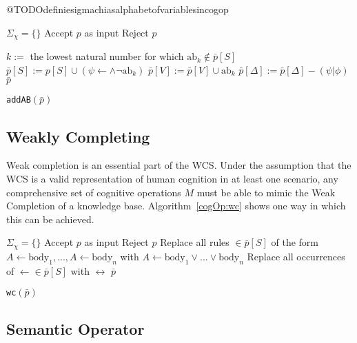 @TODOdefiniesigmachiasalphabetofvariablesincogop

\begin{algorithm}[H] \label{cogOp:addAB}
\SetAlgoLined
{}
{
$\Sigma_{\chi}=\{\}$\;
{
Accept $p$ as input\;
}
{
Reject $p$\;
}
}
{
{
$k:=$ the lowest natural number for which $\text{ab}_k \notin \bar{p}[S]$\;
$\bar{p}[S]:= p[S] \cup (\psi \leftarrow \land \lnot \text{ab}_k)$\;
$\bar{p}[V]:= \bar{p}[V] \cup \text{ab}_k$\;
$\bar{p}[\Delta]:=\bar{p}[\Delta] - (\psi|\phi)$\;
\Return $\bar{p}$
}

}

\caption{\texttt{addAB}$(\bar{p})$}
\end{algorithm}

\subsection{Weakly Completing}


Weak completion is an essential part of the WCS. Under the assumption that the WCS is a valid representation of human cognition in at least one scenario, any comprehensive set of cognitive operations $M$ must be able to mimic the Weak Completion of a knowledge base. Algorithm~\ref{cogOp:wc} shows one way in which this can be achieved.

\begin{algorithm}[H] \label{cogOp:wc}
\SetAlgoLined
{}
{
$\Sigma_{\chi}=\{\}$\;
{
Accept $p$ as input\;
}
{
Reject $p$\;
}
}
{
Replace all rules $\in \bar{p}[S]$ of the form $A\leftarrow \text{body}_1,...,A\leftarrow \text{body}_n$ with $A\leftarrow \text{body}_1 \lor ... \lor \text{body}_n$ \;
Replace all occurrences of $\leftarrow \in \bar{p}[S]$ with $\leftrightarrow$ \;
\Return $\bar{p}$
}

\caption{\texttt{wc}$(\bar{p})$}
\end{algorithm}


\subsection{Semantic Operator}

